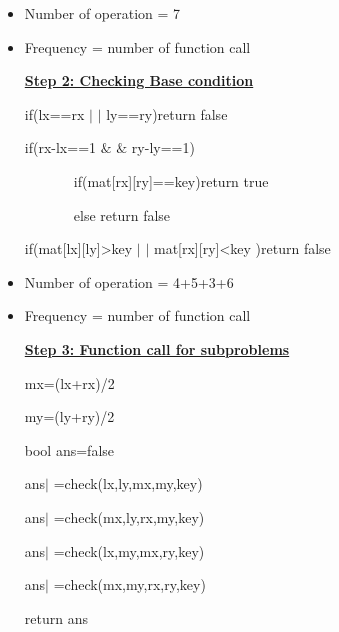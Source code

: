 \documentclass[14pt]{article}
\renewcommand{\_}{\kern-1.5pt\textunderscore\kern-1.5pt}
\begin{document}
\begin{multicols}{2}
\begin{enumerate}
\vspace{\baselineskip}
\begin{itemize}
	\item Number of operation = 7
	\item Frequency = number of function call

\vspace{\baselineskip}

\vspace{\baselineskip}
\begin{justify}
\textbf{\uline{Step 2: Checking Base condition}} 
\end{justify}

\vspace{\baselineskip}
\begin{justify}
if(lx==rx $ \vert $ $ \vert $  ly==ry)return false
\end{justify}
\begin{justify}
if(rx-lx==1 $\&$ $\&$  ry-ly==1)
\end{justify}
\begin{justify}
\ \ \ \ \ \ \  if(mat[rx][ry]==key)return true
\end{justify}
\begin{justify}
\ \ \ \ \ \ \  else return false
\end{justify}
\begin{justify}
if(mat[lx][ly]>key $ \vert $ $ \vert $  mat[rx][ry]<key )return false
\end{justify}

\vspace{\baselineskip}
	\item Number of operation = 4+5+3+6
	\item Frequency = number of function call

\vspace{\baselineskip}
\begin{justify}
\textbf{\uline{Step 3: Function call for subproblems}} 
\end{justify}

\vspace{\baselineskip}
\begin{justify}
mx=(lx+rx)/2
\end{justify}
\begin{justify}
my=(ly+ry)/2
\end{justify}
\begin{justify}
bool ans=false
\end{justify}
\begin{justify}
ans$ \vert $ =check(lx,ly,mx,my,key)
\end{justify}
\begin{justify}
ans$ \vert $ =check(mx,ly,rx,my,key)
\end{justify}
\begin{justify}
ans$ \vert $ =check(lx,my,mx,ry,key)
\end{justify}
\begin{justify}
ans$ \vert $ =check(mx,my,rx,ry,key)
\end{justify}
\begin{justify}
return ans
\end{justify}


\end{itemize}
\end{enumerate}
\end{multicols}
\end{document}
